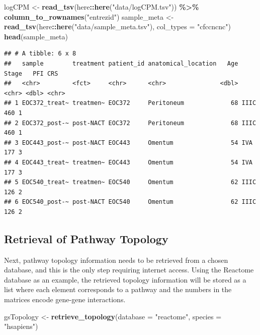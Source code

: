 \documentclass[9pt,a4paper,]{extarticle}
\newenvironment{Shaded}{\begin{snugshade}}{\end{snugshade}}
\newcommand{\AttributeTok}[1]{\textcolor[rgb]{0.13,0.29,0.53}{#1}}
\newcommand{\FunctionTok}[1]{\textcolor[rgb]{0.13,0.29,0.53}{\textbf{#1}}}
\newcommand{\NormalTok}[1]{#1}
\newcommand{\OtherTok}[1]{\textcolor[rgb]{0.56,0.35,0.01}{#1}}
\newcommand{\SpecialCharTok}[1]{\textcolor[rgb]{0.81,0.36,0.00}{\textbf{#1}}}
\newcommand{\StringTok}[1]{\textcolor[rgb]{0.31,0.60,0.02}{#1}}
\begin{document}
\begin{Shaded}
\begin{Highlighting}[]
\NormalTok{logCPM }\OtherTok{\textless{}{-}} \FunctionTok{read\_tsv}\NormalTok{(here}\SpecialCharTok{::}\FunctionTok{here}\NormalTok{(}\StringTok{"data/logCPM.tsv"}\NormalTok{)) }\SpecialCharTok{\%\textgreater{}\%}
    \FunctionTok{column\_to\_rownames}\NormalTok{(}\StringTok{"entrezid"}\NormalTok{)}
\NormalTok{sample\_meta }\OtherTok{\textless{}{-}} \FunctionTok{read\_tsv}\NormalTok{(here}\SpecialCharTok{::}\FunctionTok{here}\NormalTok{(}\StringTok{"data/sample\_meta.tsv"}\NormalTok{), }\AttributeTok{col\_types =} \StringTok{"cfccncnc"}\NormalTok{)}
\FunctionTok{head}\NormalTok{(sample\_meta)}
\end{Highlighting}
\end{Shaded}

\begin{verbatim}
## # A tibble: 6 x 8
##   sample        treatment patient_id anatomical_location   Age Stage   PFI CRS  
##   <chr>         <fct>     <chr>      <chr>               <dbl> <chr> <dbl> <chr>
## 1 EOC372_treat~ treatmen~ EOC372     Peritoneum             68 IIIC    460 1    
## 2 EOC372_post-~ post-NACT EOC372     Peritoneum             68 IIIC    460 1    
## 3 EOC443_post-~ post-NACT EOC443     Omentum                54 IVA     177 3    
## 4 EOC443_treat~ treatmen~ EOC443     Omentum                54 IVA     177 3    
## 5 EOC540_treat~ treatmen~ EOC540     Omentum                62 IIIC    126 2    
## 6 EOC540_post-~ post-NACT EOC540     Omentum                62 IIIC    126 2
\end{verbatim}

\hypertarget{retrieval-of-pathway-topology}{%
\subsection{Retrieval of Pathway Topology}\label{retrieval-of-pathway-topology}}

Next, pathway topology information needs to be retrieved from a chosen database, and this is the only step requiring internet access.
Using the Reactome database\citep{reactome2021} as an example, the retrieved topology information will be stored as a list where each element corresponds to a pathway and the numbers in the matrices encode gene-gene interactions.

\begin{Shaded}
\begin{Highlighting}[]
\NormalTok{gsTopology }\OtherTok{\textless{}{-}} \FunctionTok{retrieve\_topology}\NormalTok{(}\AttributeTok{database =} \StringTok{"reactome"}\NormalTok{, }\AttributeTok{species =} \StringTok{"hsapiens"}\NormalTok{)}
\end{Highlighting}
\end{Shaded}
\end{document}
